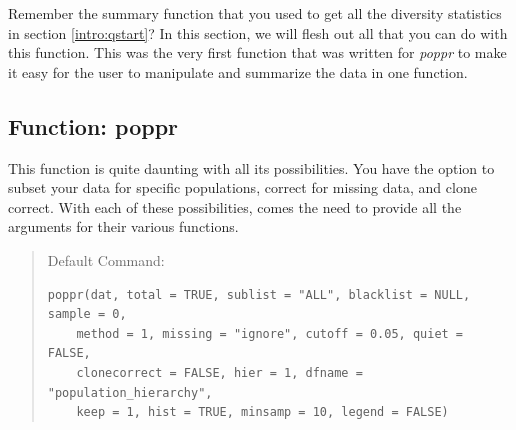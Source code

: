 \documentclass[letterpaper]{article}\usepackage[]{graphicx}\usepackage[]{color}
\makeatletter
\newenvironment{kframe}{%
 \def\at@end@of@kframe{}%
 \ifinner\ifhmode%
  \def\at@end@of@kframe{\end{minipage}}%
  \begin{minipage}{\columnwidth}%
 \fi\fi%
 \def\FrameCommand##1{\hskip\@totalleftmargin \hskip-\fboxsep
 \colorbox{shadecolor}{##1}\hskip-\fboxsep
     \hskip-\linewidth \hskip-\@totalleftmargin \hskip\columnwidth}%
 \MakeFramed {\advance\hsize-\width
   \@totalleftmargin\z@ \linewidth\hsize
   \@setminipage}}%
 {\par\unskip\endMakeFramed%
 \at@end@of@kframe}
\newenvironment{knitrout}{}{} %
\newcommand{\tab}{\hspace*{1em}}
\makeatother
\begin{document}
\tab\tab Remember the summary function that you used to get all the diversity statistics in section \ref{intro:qstart}? In this section, we will flesh out all that you can do with this function. This was the very first function that was written for \textit{poppr} to make it easy for the user to manipulate and summarize the data in one function.
\subsection{Function: poppr}\label{summary:poppr}

\tab\tab This function is quite daunting with all its possibilities. You have the option to subset your data for specific populations, correct for missing data, and clone correct. With each of these possibilities, comes the need to provide all the arguments for their various functions.
\begin{quote}
Default Command:
\begin{knitrout}
\color{fgcolor}\begin{kframe}
\begin{verbatim}
poppr(dat, total = TRUE, sublist = "ALL", blacklist = NULL, sample = 0, 
    method = 1, missing = "ignore", cutoff = 0.05, quiet = FALSE, 
    clonecorrect = FALSE, hier = 1, dfname = "population_hierarchy", 
    keep = 1, hist = TRUE, minsamp = 10, legend = FALSE)
\end{verbatim}
\end{kframe}
\end{knitrout}

\end{quote}
\end{document}
